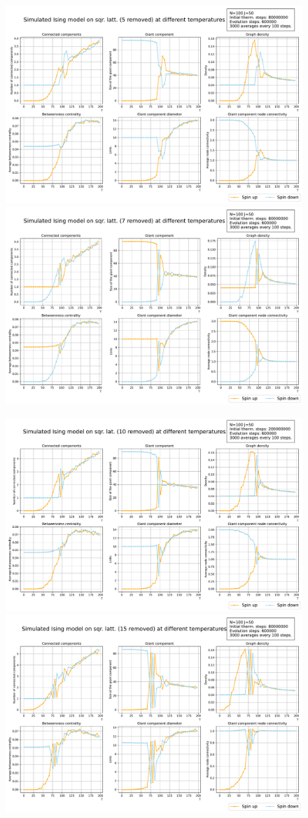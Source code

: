 \begin{figure}[!htb]
  \includegraphics[width=.5\linewidth]{Broken/Figure_5.pdf}
  \includegraphics[width=.5\linewidth]{Broken/Square_7.pdf}

  \includegraphics[width=.5\linewidth]{Broken/Square_10.pdf}
  \includegraphics[width=.5\linewidth]{Broken/Square_15.pdf}


\end{figure}
